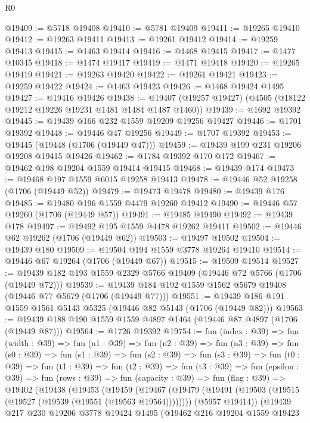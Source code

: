 \begin{lexlean}{R0}
\begin{coremodule}
@19409 := @5718 @19408
@19410 := @5781 @19409
@19411 := @19265 @19410
@19412 := @19263 @19411
@19413 := @19261 @19412
@19414 := @19259 @19413
@19415 := @1463 @19414
@19416 := @1468 @19415
@19417 := @1477 @10345
@19418 := @1474 @19417
@19419 := @1471 @19418
@19420 := @19265 @19419
@19421 := @19263 @19420
@19422 := @19261 @19421
@19423 := @19259 @19422
@19424 := @1463 @19423
@19426 := @1468 @19424 @1495
@19427 := @19416 @19426
@19438 := @19407 (@19257 @19427) (@4505 (@18122 @19212 @19226 @19231 @1481 @1484 @1487 @1460))
@19439 := @1692 @19392
@19445 := @19439 @166 @232 @1559 @19209 @19256 @19427
@19446 := @1701 @19392
@19448 := @19446 @47 @19256
@19449 := @1707 @19392
@19453 := @19445 (@19448 (@1706 (@19449 @47)))
@19459 := @19439 @199 @231 @19206 @19208 @19415 @19426
@19462 := @1784 @19392 @170 @172
@19467 := @19462 @198 @19204 @1559 @19414 @19415
@19468 := @19439 @174
@19473 := @19468 @197 @1559 @6015 @19258 @19413
@19478 := @19446 @52 @19258 (@1706 (@19449 @52))
@19479 := @19473 @19478
@19480 := @19439 @176
@19485 := @19480 @196 @1559 @4479 @19260 @19412
@19490 := @19446 @57 @19260 (@1706 (@19449 @57))
@19491 := @19485 @19490
@19492 := @19439 @178
@19497 := @19492 @195 @1559 @4478 @19262 @19411
@19502 := @19446 @62 @19262 (@1706 (@19449 @62))
@19503 := @19497 @19502
@19504 := @19439 @180
@19509 := @19504 @194 @1559 @3778 @19264 @19410
@19514 := @19446 @67 @19264 (@1706 (@19449 @67))
@19515 := @19509 @19514
@19527 := @19439 @182 @193 @1559 @2329 @5766 @19409 (@19446 @72 @5766 (@1706 (@19449 @72)))
@19539 := @19439 @184 @192 @1559 @1562 @5679 @19408 (@19446 @77 @5679 (@1706 (@19449 @77)))
@19551 := @19439 @186 @191 @1559 @1561 @5143 @5325 (@19446 @82 @5143 (@1706 (@19449 @82)))
@19563 := @19439 @188 @190 @1559 @1559 @4897 @1464 (@19446 @87 @4897 (@1706 (@19449 @87)))
@19564 := @1726 @19392
@19754 := fun (index : @39) =>
  fun (width : @39) =>
  fun (n1 : @39) =>
  fun (n2 : @39) =>
  fun (n3 : @39) =>
  fun (s0 : @39) =>
  fun (s1 : @39) =>
  fun (s2 : @39) =>
  fun (s3 : @39) =>
  fun (t0 : @39) =>
  fun (t1 : @39) =>
  fun (t2 : @39) =>
  fun (t3 : @39) =>
  fun (epsilon : @39) =>
  fun (rows : @39) =>
  fun (capacity : @39) =>
  fun (flag : @39) =>
  @19402
    (@19438
      (@19453
        (@19459
          (@19467
            (@19479 (@19491 (@19503 (@19515 (@19527 (@19539 (@19551 (@19563 @19564))))))))
            (@5957 @19414))
          (@19439
            @217
            @230
            @19206
            @3778
            @19424
            @1495
            (@19462
              @216
              @19204
              @1559
              @19423

\end{coremodule}
\end{lexlean}
